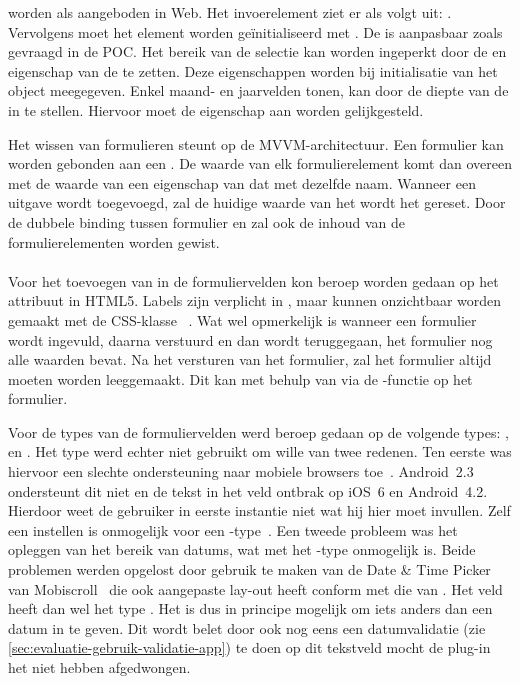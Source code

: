   worden als  aangeboden in \kendo Web.
 Het invoerelement ziet er als volgt uit: .  
 Vervolgens moet het element worden geïnitialiseerd met .
 De  is aanpasbaar zoals gevraagd in de POC.
 Het bereik van de selectie kan worden ingeperkt door de  en  eigenschap van de  te zetten.
 Deze eigenschappen worden bij initialisatie van het object meegegeven.
 Enkel maand- en jaarvelden tonen, kan door de diepte van de  in te stellen.
 Hiervoor moet de eigenschap  aan  worden gelijkgesteld.
 
 Het wissen van formulieren steunt op de MVVM-architectuur.
 Een formulier kan worden gebonden aan een .
 De waarde van elk formulierelement komt dan overeen met de waarde van een eigenschap van dat  met dezelfde naam.
 Wanneer een uitgave wordt toegevoegd, zal de huidige waarde van het  wordt het  gereset.
 Door de dubbele binding tussen formulier en  zal ook de inhoud van de formulierelementen worden gewist.
 
\paragraph{\jqm} 
Voor het toevoegen van  in de formuliervelden kon beroep worden gedaan op het attribuut in HTML5. 
Labels zijn verplicht in \jqm{}, maar kunnen onzichtbaar worden gemaakt met de CSS-klasse ~\cite{JQuery2013}. 
Wat wel opmerkelijk is wanneer een formulier wordt ingevuld, daarna verstuurd en dan wordt teruggegaan, het formulier nog alle waarden bevat. 
Na het versturen van het formulier, zal het formulier altijd moeten worden leeggemaakt. 
Dit kan met behulp van \js{} via de -functie op het formulier.
 
Voor de types van de formuliervelden werd beroep gedaan op de volgende types: ,  en . 
Het  type werd echter niet gebruikt om wille van twee redenen.
Ten eerste was hiervoor een slechte ondersteuning naar mobiele browsers toe~\cite{Deveria2013c}.
Android~2.3 ondersteunt dit niet en de tekst in het veld ontbrak op iOS~6 en Android~4.2.
Hierdoor weet de gebruiker in eerste instantie niet wat hij hier moet invullen. 
Zelf een  instellen is onmogelijk voor een -type~\cite{Berjon2012}. 
Een tweede probleem was het opleggen van het bereik van datums, wat met het -type onmogelijk is. 
Beide problemen werden opgelost door gebruik te maken van de Date \& Time Picker van Mobiscroll~\cite{Mobiscroll2013} die ook aangepaste lay-out heeft conform met die van \jqm{}. 
Het veld heeft dan wel het type .
Het is dus in principe mogelijk om iets anders dan een datum in te geven. 
Dit wordt belet door ook nog eens een datumvalidatie (zie \ref{sec:evaluatie-gebruik-validatie-app}) te doen op dit tekstveld mocht de plug-in het niet hebben afgedwongen.
 
